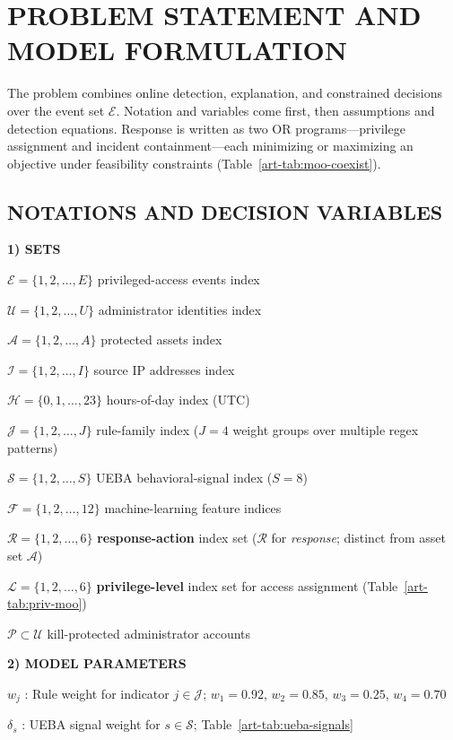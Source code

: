 \section{PROBLEM STATEMENT AND MODEL FORMULATION}
\label{art-sec:formulation}

The problem combines online detection, explanation, and constrained decisions over the event set $\mathcal{E}$. Notation and variables come first, then assumptions and detection equations. Response is written as two OR programs---privilege assignment and incident containment---each minimizing or maximizing an objective under feasibility constraints (Table~\ref{art-tab:moo-coexist}).

\subsection{NOTATIONS AND DECISION VARIABLES}

\textbf{1) SETS}

$\mathcal{E}=\{1,2,\ldots,E\}$ privileged-access events index

$\mathcal{U}=\{1,2,\ldots,U\}$ administrator identities index

$\mathcal{A}=\{1,2,\ldots,A\}$ protected assets index

$\mathcal{I}=\{1,2,\ldots,I\}$ source IP addresses index

$\mathcal{H}=\{0,1,\ldots,23\}$ hours-of-day index (UTC)

$\mathcal{J}=\{1,2,\ldots,J\}$ rule-family index ($J=4$ weight groups over multiple regex patterns)

$\mathcal{S}=\{1,2,\ldots,S\}$ UEBA behavioral-signal index ($S=8$)

$\mathcal{F}=\{1,2,\ldots,12\}$ machine-learning feature indices

$\mathcal{R}=\{1,2,\ldots,6\}$ \textbf{response-action} index set ($\mathcal{R}$ for \textit{response}; distinct from asset set $\mathcal{A}$)

$\mathcal{L}=\{1,2,\ldots,6\}$ \textbf{privilege-level} index set for access assignment (Table~\ref{art-tab:priv-moo})

$\mathcal{P}\subset\mathcal{U}$ kill-protected administrator accounts

\textbf{2) MODEL PARAMETERS}

$w_j$ : Rule weight for indicator $j\in\mathcal{J}$; $w_1=0.92$, $w_2=0.85$, $w_3=0.25$, $w_4=0.70$

$\delta_s$ : UEBA signal weight for $s\in\mathcal{S}$; Table~\ref{art-tab:ueba-signals}

